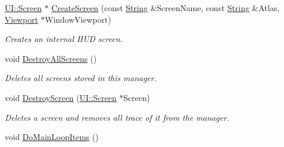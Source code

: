 \begin{DoxyCompactItemize}
\hyperlink{classMezzanine_1_1UI_1_1Screen}{UI::Screen} $\ast$ \hyperlink{classMezzanine_1_1UIManager_a1470d292a2ebea8438eddcc9abcf139f}{CreateScreen} (const \hyperlink{namespaceMezzanine_acf9fcc130e6ebf08e3d8491aebcf1c86}{String} \&ScreenName, const \hyperlink{namespaceMezzanine_acf9fcc130e6ebf08e3d8491aebcf1c86}{String} \&Atlas, \hyperlink{classMezzanine_1_1Viewport}{Viewport} $\ast$WindowViewport)
\begin{DoxyCompactList}\small\item\em Creates an internal HUD screen. \item\end{DoxyCompactList}\item 
\hypertarget{classMezzanine_1_1UIManager_a43e0ae42532e4c7a9d16ea46775be110}{
void \hyperlink{classMezzanine_1_1UIManager_a43e0ae42532e4c7a9d16ea46775be110}{DestroyAllScreens} ()}
\label{classMezzanine_1_1UIManager_a43e0ae42532e4c7a9d16ea46775be110}

\begin{DoxyCompactList}\small\item\em Deletes all screens stored in this manager. \item\end{DoxyCompactList}\item 
void \hyperlink{classMezzanine_1_1UIManager_a8634d75235a218f1b7c77a33fb2c4273}{DestroyScreen} (\hyperlink{classMezzanine_1_1UI_1_1Screen}{UI::Screen} $\ast$Screen)
\begin{DoxyCompactList}\small\item\em Deletes a screen and removes all trace of it from the manager. \item\end{DoxyCompactList}\item 
\hypertarget{classMezzanine_1_1UIManager_af774da651d30b4fe1ea086899c1961ca}{
void \hyperlink{classMezzanine_1_1UIManager_af774da651d30b4fe1ea086899c1961ca}{DoMainLoopItems} ()}
\label{classMezzanine_1_1UIManager_af774da651d30b4fe1ea086899c1961ca}


\end{DoxyCompactItemize}

